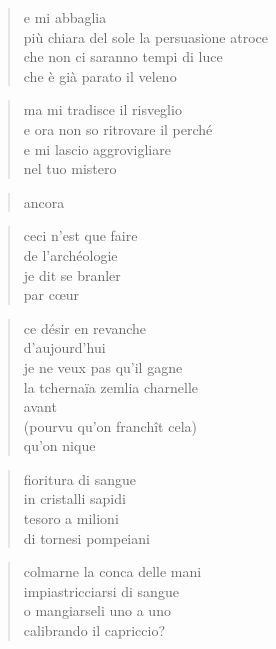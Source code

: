 \begin{poem}
\begin{poem}
	\begin{verse}
		e mi abbaglia\\
		più chiara del sole la persuasione atroce\\
		che non ci saranno tempi di luce\\
		che è già parato il veleno
	\end{verse}

	\begin{verse}
		ma mi tradisce il risveglio\\
		e ora non so ritrovare il perché\\
		e mi lascio aggrovigliare\\
		nel tuo mistero
	\end{verse}

	\begin{verse}
		ancora
	\end{verse}

\clearpage


	\begin{verse}
		ceci n'est que faire\\
		de l'archéologie\\
		je dit se branler\\
		par cœur
	\end{verse}

	\begin{verse}
		ce désir en revanche\\
		d'aujourd'hui\\
		je ne veux pas qu'il gagne\\
		la tchernaïa zemlia charnelle\\
		avant\\
		(pourvu qu'on franchît cela)\\
		qu'on nique
	\end{verse}

\clearpage


	\begin{verse}
		fioritura di sangue\\
		in cristalli sapidi\\
		tesoro a milioni\\
		di tornesi pompeiani
	\end{verse}

	\begin{verse}
		colmarne la conca delle mani\\
		impiastricciarsi di sangue\\
		o mangiarseli uno a uno\\
		calibrando il capriccio?
	\end{verse}


\end{poem}
\end{poem}
